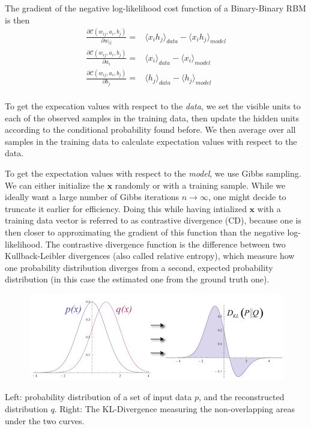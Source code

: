 \documentclass[norsk,a4paper,11pt]{beamer}
\begin{document}
\begin{frame}
The gradient of the negative log-likelihood cost function of a Binary-Binary RBM is then
\begin{align}
	\frac{\partial \mathcal{C} (w_{ij}, a_i, b_j)}{\partial w_{ij}} =& \langle x_i h_j \rangle_{data} - \langle x_i h_j \rangle_{model} \\
	\frac{\partial \mathcal{C} (w_{ij}, a_i, b_j)}{\partial a_{i}} =& \langle x_i \rangle_{data} - \langle x_i \rangle_{model} \\
	\frac{\partial \mathcal{C} (w_{ij}, a_i, b_j)}{\partial b_{j}} =& \langle h_j \rangle_{data} - \langle h_j \rangle_{model} \\
\end{align}

To get the expecation values with respect to the \textit{data}, we set the visible units to each of the observed samples in the training data, then update the hidden units according to the conditional probability found before. We then average over all samples in the training data to calculate expectation values with respect to the data. 
\end{frame}
\begin{frame}
To get the expectation values with respect to the \textit{model}, we use Gibbs sampling. We can either initialize the $\bm{x}$ randomly or with a training sample. While we ideally want a large number of Gibbs iterations $n\rightarrow \infty$, one might decide to truncate it earlier for efficiency. Doing this while having intialized $\bm{x}$ with a training data vector is referred to as contrastive divergence (CD), because one is then closer to approximating the gradient of this function than the negative log-likelihood. The contrastive divergence function is the difference between two Kullback-Leibler divergences (also called relative entropy), which measure how one probability distribution diverges from a second, expected probability distribution (in this case the estimated one from the ground truth one).
\end{frame}


\begin{frame}
\begin{figure}
    \includegraphics[width=0.9\linewidth]{KL_divergence_RBM.png}
\end{figure}
Left: probability distribution of a set of input data $p$, and the reconstructed distribution $q$. Right: The KL-Divergence measuring the non-overlapping areas under the two curves.
\end{frame}
\end{document}
